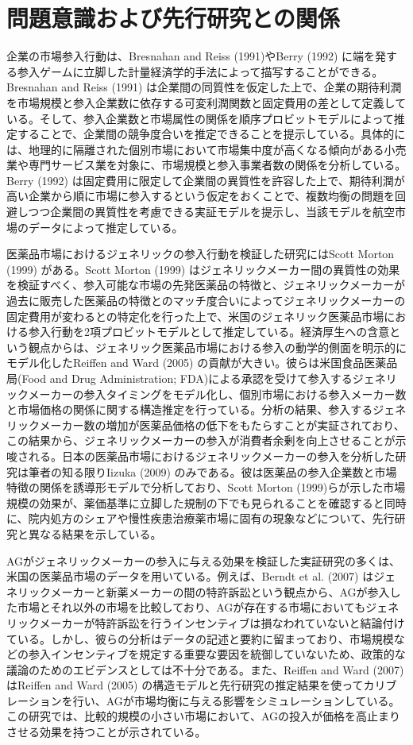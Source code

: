 \documentclass[a4j,10.5pt]{jarticle}
\begin{document}
\section{問題意識および先行研究との関係}

企業の市場参入行動は、Bresnahan and Reiss (1991)やBerry (1992) に端を発する参入ゲームに立脚した計量経済学的手法によって描写することができる。Bresnahan and Reiss (1991) は企業間の同質性を仮定した上で、企業の期待利潤を市場規模と参入企業数に依存する可変利潤関数と固定費用の差として定義している。そして、参入企業数と市場属性の関係を順序プロビットモデルによって推定することで、企業間の競争度合いを推定できることを提示している。具体的には、地理的に隔離された個別市場において市場集中度が高くなる傾向がある小売業や専門サービス業を対象に、市場規模と参入事業者数の関係を分析している。Berry (1992) は固定費用に限定して企業間の異質性を許容した上で、期待利潤が高い企業から順に市場に参入するという仮定をおくことで、複数均衡の問題を回避しつつ企業間の異質性を考慮できる実証モデルを提示し、当該モデルを航空市場のデータによって推定している。\par
医薬品市場におけるジェネリックの参入行動を検証した研究にはScott Morton (1999) がある。Scott Morton (1999) はジェネリックメーカー間の異質性の効果を検証すべく、参入可能な市場の先発医薬品の特徴と、ジェネリックメーカーが過去に販売した医薬品の特徴とのマッチ度合いによってジェネリックメーカーの固定費用が変わるとの特定化を行った上で、米国のジェネリック医薬品市場における参入行動を2項プロビットモデルとして推定している。経済厚生への含意という観点からは、ジェネリック医薬品市場における参入の動学的側面を明示的にモデル化したReiffen and Ward (2005) の貢献が大きい。彼らは米国食品医薬品局(Food and Drug Administration; FDA)による承認を受けて参入するジェネリックメーカーの参入タイミングをモデル化し、個別市場における参入メーカー数と市場価格の関係に関する構造推定を行っている。分析の結果、参入するジェネリックメーカー数の増加が医薬品価格の低下をもたらすことが実証されており、この結果から、ジェネリックメーカーの参入が消費者余剰を向上させることが示唆される。日本の医薬品市場におけるジェネリックメーカーの参入を分析した研究は筆者の知る限りIizuka (2009) のみである。彼は医薬品の参入企業数と市場特徴の関係を誘導形モデルで分析しており、Scott Morton (1999)らが示した市場規模の効果が、薬価基準に立脚した規制の下でも見られることを確認すると同時に、院内処方のシェアや慢性疾患治療薬市場に固有の現象などについて、先行研究と異なる結果を示している。\par
AGがジェネリックメーカーの参入に与える効果を検証した実証研究の多くは、米国の医薬品市場のデータを用いている。例えば、Berndt et al. (2007) はジェネリックメーカーと新薬メーカーの間の特許訴訟という観点から、AGが参入した市場とそれ以外の市場を比較しており、AGが存在する市場においてもジェネリックメーカーが特許訴訟を行うインセンティブは損なわれていないと結論付けている。しかし、彼らの分析はデータの記述と要約に留まっており、市場規模などの参入インセンティブを規定する重要な要因を統御していないため、政策的な議論のためのエビデンスとしては不十分である。また、Reiffen and Ward (2007) はReiffen and Ward (2005) の構造モデルと先行研究の推定結果を使ってカリブレーションを行い、AGが市場均衡に与える影響をシミュレーションしている。この研究では、比較的規模の小さい市場において、AGの投入が価格を高止まりさせる効果を持つことが示されている。\par
\end{document}
